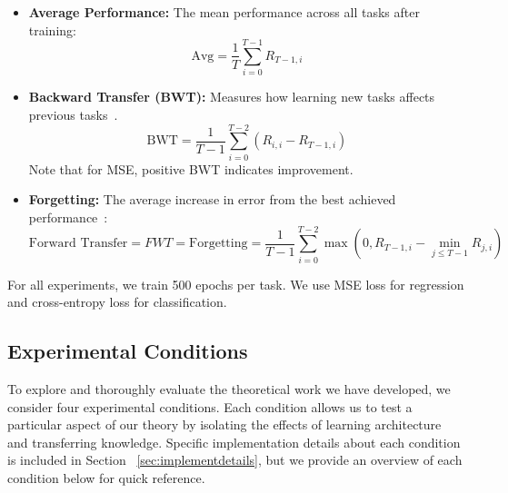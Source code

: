 \begin{itemize}
    \item \textbf{Average Performance:} The mean performance across all tasks after training:
    \[
    \text{Avg} = \frac{1}{T} \sum_{i=0}^{T-1} R_{T-1,i}
    \]

    \item \textbf{Backward Transfer (BWT):} Measures how learning new tasks affects previous tasks~\cite{lopez2017gradient}.
    \[
    \text{BWT} = \frac{1}{T-1} \sum_{i=0}^{T-2} \left( R_{i,i} - R_{T-1,i} \right)
    \]
    Note that for MSE, positive BWT indicates improvement.

    \item \textbf{Forgetting:} The average increase in error from the best achieved performance~\cite{chaudhry2018riemannian}:
    \[
    \text{Forward Transfer} = FWT = \text{Forgetting} = \frac{1}{T-1} \sum_{i=0}^{T-2} \max\left(0, R_{T-1,i} - \min_{j \leq T-1} R_{j,i}\right)
    \]
\end{itemize}

For all experiments, we train 500 epochs per task. We use MSE loss for regression and cross-entropy loss for classification.

\subsection{Experimental Conditions}
To explore and thoroughly evaluate the theoretical work we have developed, we consider four experimental conditions. Each condition allows us to test a particular aspect of our theory by isolating the effects of learning architecture and transferring knowledge. Specific implementation details about each condition is included in Section ~\ref{sec:implementdetails}, but we provide an overview of each condition below for quick reference.


